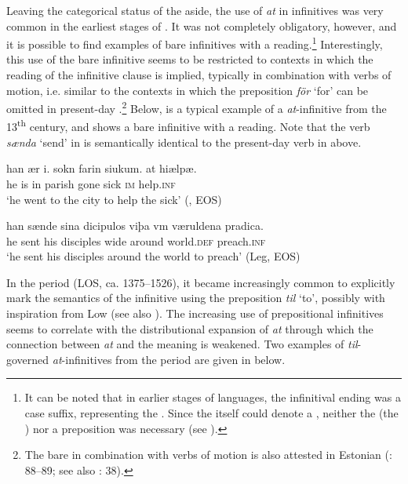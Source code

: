 \documentclass[output=paper]{langscibook}
\begin{document}
Leaving the categorical status of the  aside, the use of \textit{at} in  infinitives was very common in the earliest stages of . It was not completely obligatory, however, and it is possible to find examples of bare infinitives with a  reading.\footnote{It can be noted that in earlier stages of  languages, the infinitival ending was a case suffix, representing the . Since the  itself could denote a , neither the  (the ) nor a preposition was necessary (see \citealt{Haspelmath1989,Jeffers1975}).} Interestingly, this use of the bare infinitive seems to be restricted to contexts in which the  reading of the infinitive clause is implied, typically in combination with verbs of motion, i.e. similar to the contexts in which the preposition \textit{för} ‘for’ can be omitted in present-day .\footnote{The bare  in combination with verbs of motion is also attested in Estonian  (\citealt{Lagman1958}: 88–89; see also \citealt{Jorgensen1970}: 38).}  Below,  is a typical example of a  \textit{at}-infinitive from the 13\textsuperscript{th} century, and  shows a bare infinitive with a  reading. Note that the verb \textit{sænda} ‘send’ in  is semantically identical to the present-day  verb in  above.\largerpage

\ea
\label{ex:kalm:9}
\ea \label{ex:kalm:9a}
\gll han ær i. sokn farin siukum. at hiælpæ.\\
 he is in parish gone sick \textsc{im} help.\textsc{inf}\\ 
\glt ‘he went to the city to help the sick’ (, EOS)

\ex \label{ex:kalm:9b}
\gll han sænde sina dicipulos viþa vm væruldena pradica.\\ 
 he sent his disciples wide around world.\textsc{def} preach.\textsc{inf}\\
\glt ‘he sent his disciples around the world to preach’ (Leg, EOS)
\z 
\z 

In the  period (LOS, ca. 1375–1526), it became increasingly common to explicitly mark the  semantics of the infinitive using the preposition \textit{til} ‘to’, possibly with inspiration from Low  (see also ). The increasing use of prepositional  infinitives seems to correlate with the distributional expansion of \textit{at} through which the connection between \textit{at} and the  meaning is weakened. Two examples of \textit{til}{}-governed  \textit{at}{}-infinitives from the  period are given in  below. 
\end{document}
